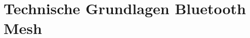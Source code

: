 \clearpage
\section{Technische Grundlagen Bluetooth Mesh}\label{sec:TechnischeGrundlagenBluetoothMesh}



